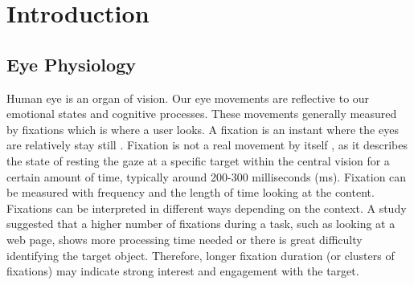 




\lstset{language=Java, basicstyle=\footnotesize}

\renewcommand{\thepage}{\roman{page}}
\newcommand{\monthword}[1]{\ifcase#1\or January\or February\or March\or April\or
                                        May\or June\or July\or August\or
                                        September\or October\or November\or December\fi} 





\clearpage

\begingroup
  \pagestyle{plain}

\setcounter{tocdepth}{2}
  \tableofcontents
  \clearpage
\endgroup 

\pagestyle{fancy}
\setcounter{page}{1}
\renewcommand{\thepage}{\arabic{page}}

\section{Introduction}

\subsection{Eye Physiology}

Human eye is an organ of vision. Our eye movements are reflective to our emotional states and cognitive processes. These movements generally measured by fixations which is where a user looks. A fixation is an instant where the eyes are relatively stay still \cite{15}. Fixation is not a real movement by itself \cite{13}, as it describes the state of resting the gaze at a specific target within the central vision for a certain amount of time, typically around 200-300 milliseconds (ms). Fixation can be measured with frequency and the length of time looking at the content. Fixations can be interpreted in different ways depending on the context. A study \cite{24} suggested that a higher number of fixations during a task, such as looking at a web page, shows more processing time needed or there is great difficulty identifying the target object. Therefore, longer fixation duration (or clusters of fixations) may indicate strong interest and engagement with the target.\\

